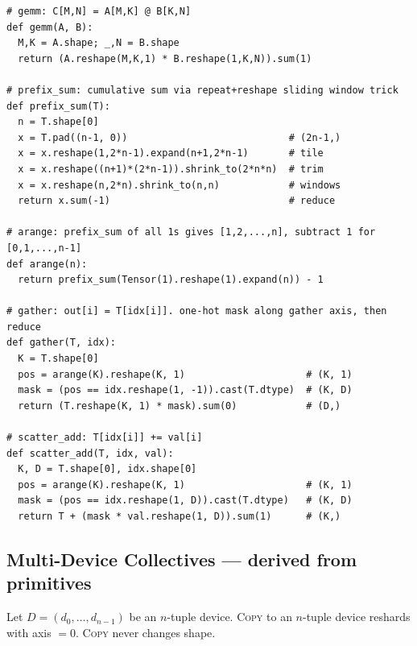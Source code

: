 \documentclass[10pt,letterpaper]{article}
\newcommand{\op}[1]{\textsc{#1}}
\begin{document}
\begin{lstlisting}
# gemm: C[M,N] = A[M,K] @ B[K,N]
def gemm(A, B):
  M,K = A.shape; _,N = B.shape
  return (A.reshape(M,K,1) * B.reshape(1,K,N)).sum(1)

# prefix_sum: cumulative sum via repeat+reshape sliding window trick
def prefix_sum(T):
  n = T.shape[0]
  x = T.pad((n-1, 0))                            # (2n-1,)
  x = x.reshape(1,2*n-1).expand(n+1,2*n-1)       # tile
  x = x.reshape((n+1)*(2*n-1)).shrink_to(2*n*n)  # trim
  x = x.reshape(n,2*n).shrink_to(n,n)            # windows
  return x.sum(-1)                               # reduce

# arange: prefix_sum of all 1s gives [1,2,...,n], subtract 1 for [0,1,...,n-1]
def arange(n):
  return prefix_sum(Tensor(1).reshape(1).expand(n)) - 1

# gather: out[i] = T[idx[i]]. one-hot mask along gather axis, then reduce
def gather(T, idx):
  K = T.shape[0]
  pos = arange(K).reshape(K, 1)                     # (K, 1)
  mask = (pos == idx.reshape(1, -1)).cast(T.dtype)  # (K, D)
  return (T.reshape(K, 1) * mask).sum(0)            # (D,)

# scatter_add: T[idx[i]] += val[i]
def scatter_add(T, idx, val):
  K, D = T.shape[0], idx.shape[0]
  pos = arange(K).reshape(K, 1)                     # (K, 1)
  mask = (pos == idx.reshape(1, D)).cast(T.dtype)   # (K, D)
  return T + (mask * val.reshape(1, D)).sum(1)      # (K,)
\end{lstlisting}

\subsection*{{\color{multipurple}Multi-Device Collectives} \normalfont\small--- derived from primitives}

Let $D = (d_0, \ldots, d_{n-1})$ be an $n$-tuple device.
\op{Copy} to an $n$-tuple device reshards with axis $= 0$. \op{Copy} never changes shape.
\end{document}
